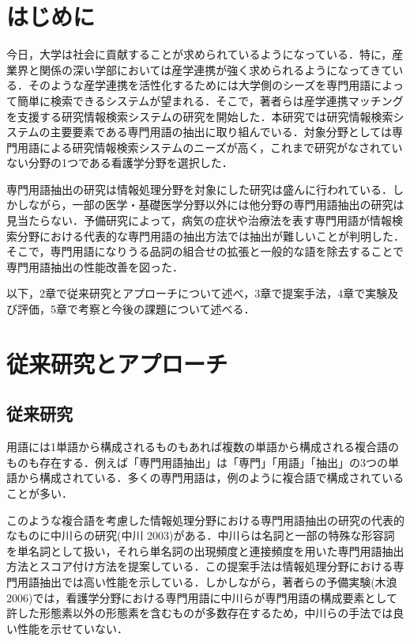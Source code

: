 \documentclass[japanese]{jnlp_1.4}
\begin{document}
\maketitle




\section{はじめに}

今日，大学は社会に貢献することが求められているようになっている．特に，産業界と関係の深い学部においては産学連携が強く求められるようになってきている．そのような産学連携を活性化するためには大学側のシーズを専門用語によって簡単に検索できるシステムが望まれる．そこで，著者らは産学連携マッチングを支援する研究情報検索システムの研究を開始した．本研究では研究情報検索システムの主要要素である専門用語の抽出に取り組んでいる．対象分野としては専門用語による研究情報検索システムのニーズが高く，これまで研究がなされていない分野の1つである看護学分野を選択した．

専門用語抽出の研究は情報処理分野を対象にした研究は盛んに行われている．しかしながら，一部の医学・基礎医学分野以外には他分野の専門用語抽出の研究は見当たらない．予備研究によって，病気の症状や治療法を表す専門用語が情報検索分野における代表的な専門用語の抽出方法では抽出が難しいことが判明した．そこで，専門用語になりうる品詞の組合せの拡張と一般的な語を除去することで専門用語抽出の性能改善を図った．

以下，2章で従来研究とアプローチについて述べ，3章で提案手法，4章で実験及び評価，5章で考察と今後の課題について述べる．

\section{従来研究とアプローチ}

\subsection{従来研究}

用語には1単語から構成されるものもあれば複数の単語から構成される複合語のものも存在する．例えば「専門用語抽出」は「専門」「用語」「抽出」の3つの単語から構成されている．多くの専門用語は，例のように複合語で構成されていることが多い．

このような複合語を考慮した情報処理分野における専門用語抽出の研究の代表的なものに中川らの研究(中川 2003)がある．中川らは名詞と一部の特殊な形容詞を単名詞として扱い，それら単名詞の出現頻度と連接頻度を用いた専門用語抽出方法とスコア付け方法を提案している．この提案手法は情報処理分野における専門用語抽出では高い性能を示している．しかしながら，著者らの予備実験(木浪 2006)では，看護学分野における専門用語に中川らが専門用語の構成要素として許した形態素以外の形態素を含むものが多数存在するため，中川らの手法では良い性能を示せていない．
\end{document}
